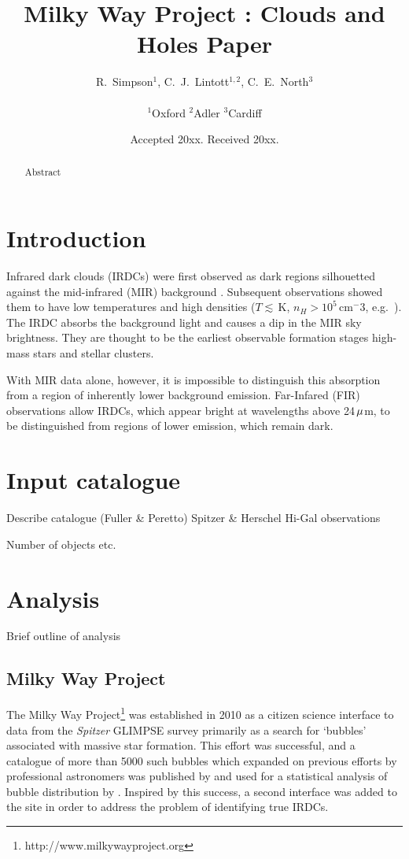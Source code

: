 \documentclass[a4,useAMS,usenatbib]{mn2e}
\title{Milky Way Project : Clouds and Holes Paper}
\author[Simpson et al.]{R.~Simpson$^1$, C.~J.~Lintott$^{1,2}$, C.~E.~North$^3$\\
\\
$^1$Oxford
$^2$Adler
$^3$Cardiff
}
\def\mic{$\umu$m}
\begin{document}
\date{Accepted 20xx. Received 20xx.}

\pagerange{\pageref{firstpage}--\pageref{lastpage}} 

\maketitle

\label{firstpage}

\begin{abstract}
Abstract
\end{abstract}

\section{Introduction}
Infrared dark clouds (IRDCs) were first observed as dark regions
silhouetted against the mid-infrared (MIR) background
\citep{Wilcock2011}. Subsequent observations showed them to have low
temperatures and high densities ($T\lesssim$\,K, $n_H > 10^5$\,cm$^-3$,
e.g.~\citet{Egan98,Carey98,HennebellePerault02}). The IRDC absorbs the
background light and causes a dip in the MIR sky brightness. They are
thought to be the earliest observable formation stages high-mass stars
and stellar clusters.

With MIR data alone, however, it is impossible to distinguish this
absorption from a region of inherently lower background
emission. Far-Infared (FIR) observations allow IRDCs, which appear
bright at wavelengths above 24\,\mic, to be distinguished from regions
of lower emission, which remain dark. 


\section{Input catalogue}
Describe catalogue (Fuller \& Peretto)
Spitzer \& Herschel Hi-Gal observations

Number of objects etc.

\section{Analysis}
Brief outline of analysis

\subsection{Milky Way Project}
The Milky Way Project\footnote{http://www.milkywayproject.org} was established in 2010 as a citizen science interface to data from the \emph{Spitzer} GLIMPSE survey primarily as a search for `bubbles' associated with massive star formation. This effort was successful, and a catalogue of more than 5000 such bubbles which expanded on previous efforts by professional astronomers was published by \citet{Simpsonetal} and used for a statistical analysis of bubble distribution by \citet{Kendrewetal}. Inspired by this success, a second interface was added to the site in order to address the problem of identifying true IRDCs.
\end{document}
